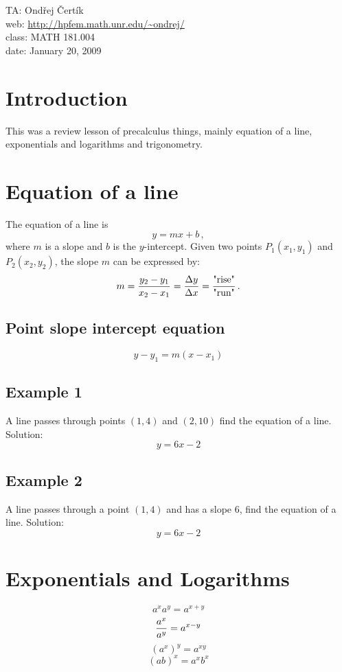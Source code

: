 \documentclass[10pt]{article}
\begin{document}
\noindent TA: Ondřej Čertík\\
web: \url{http://hpfem.math.unr.edu/~ondrej/}\\
class: MATH 181.004\\
date: January 20, 2009

\section{Introduction}

This was a review lesson of precalculus things, mainly equation of a line,
exponentials and logarithms and trigonometry.

\section{Equation of a line}

The equation of a line is
$$y=mx+b\,,$$
where $m$ is a slope and $b$ is the $y$-intercept. Given two points $P_1(x_1,
y_1)$ and $P_2(x_2, y_2)$, the slope $m$ can be expressed by:
$$m={y_2-y_1\over x_2-x_1}={\Delta y\over\Delta x} = {\mbox{"rise"}\over\mbox{"run"}}\,.$$

\subsection{Point slope intercept equation}

$$y-y_1 = m(x-x_1)$$

\subsection{Example 1}

A line passes through points $(1, 4)$ and $(2, 10)$ find the equation of a
line. Solution:
$$y=6x-2$$

\subsection{Example 2}

A line passes through a point $(1, 4)$ and has a slope 6, find the equation of a
line. Solution:
$$y=6x-2$$

\section{Exponentials and Logarithms}

$$a^xa^y = a^{x+y}$$
$${a^x\over a^y} = a^{x-y}$$
$$(a^x)^y = a^{xy}$$
$$(ab)^x = a^xb^x$$
\end{document}
